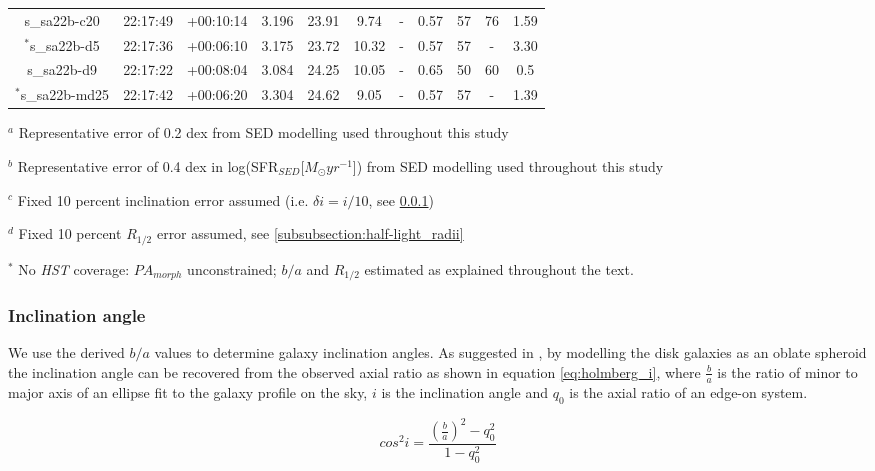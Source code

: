 \documentclass[fleqn,usenatbib]{mn2e}
\begin{document}
\begin{table*}
\begin{threeparttable}
\begin{tabular}{ccccccccccc}
s\_sa22b-c20  & 22:17:49 & +00:10:14 & 3.196     & 23.91 & 9.74  & -            & 0.57        & 57        & 76    & 1.59      \\
$^{*}$s\_sa22b-d5  & 22:17:36 & +00:06:10 & 3.175 & 23.72 & 10.32 & -            & 0.57         & 57        & -    & 3.30      \\
s\_sa22b-d9   & 22:17:22 & +00:08:04 & 3.084    & 24.25 & 10.05 & -            & 0.65        & 50        & 60   & 0.5       \\
$^{*}$s\_sa22b-md25 & 22:17:42 & +00:06:20 & 3.304     & 24.62 & 9.05  & -            & 0.57         & 57        & -    & 1.39      

\end{tabular}
\begin{tablenotes}
      \small
      \item $^{a}$ Representative error of 0.2 dex from SED modelling used throughout this study
      \item $^{b}$ Representative error of 0.4 dex in log(SFR$_{SED}$[$M_{\odot}yr^{-1}$]) from SED modelling used throughout this study
      \item $^{c}$ Fixed 10 percent inclination error assumed (i.e. $\delta i = i / 10$, see \protect\cref{subsubsection:inclination_angle})
      \item $^{d}$ Fixed 10 percent $R_{1/2}$ error assumed, see \protect\cref{subsubsection:half-light_radii}
      \item $^{*}$ No {\em HST} coverage: $PA_{morph}$ unconstrained; $b/a$ and $R_{1/2}$ estimated as explained throughout the text.
    \end{tablenotes}
  \end{threeparttable}
  \end{table*}


\subsubsection{Inclination angle}\label{subsubsection:inclination_angle}
We use the derived $b/a$ values to determine galaxy inclination angles.
As suggested in \cite{Holmberg1958}, by modelling the disk galaxies as an oblate spheroid the inclination angle can be recovered from the observed axial ratio as shown in equation \ref{eq:holmberg_i}, where $\frac{b}{a}$ is the ratio of minor to major axis of an ellipse fit to the galaxy profile on the sky, $i$ is the inclination angle and $q_{0}$ is the axial ratio of an edge-on system.

\begin{equation}\label{eq:holmberg_i}
   cos^{2}i = \frac{\left(\frac{b}{a}\right)^{2} - q_{0}^{2}}{1 - q_{0}^{2}}
\end{equation}
\end{document}

